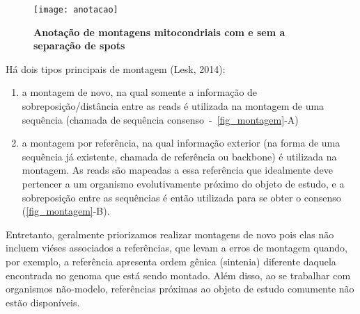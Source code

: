 \documentclass[../DISSERTACAO_MAIN.tex]{subfiles}
\begin{document}
\begin{figure}[htb]
	\texttt{[image: anotacao]}
	\caption[Anotação de montagens mitocondriais e separação de spots] {\textbf{Anotação de montagens mitocondriais com e sem a separação de spots}}
	\label{fig_anotacao}
\end{figure}


Há dois tipos principais de montagem (Lesk, 2014): 

\begin{enumerate}[label=(\roman*)]
		\item a montagem de novo, na qual somente a informação de sobreposição/distância entre as reads é utilizada na montagem de uma sequência (chamada de sequência consenso~-~\autoref{fig_montagem}-A)
	\item  a montagem por referência, na qual informação exterior (na forma de uma sequência já existente, chamada de referência ou backbone) é utilizada na montagem. As reads são mapeadas a essa referência que idealmente deve pertencer a um organismo evolutivamente próximo do objeto de estudo, e a sobreposição entre as sequências é então utilizada para se obter o consenso (\autoref{fig_montagem}-B).
\end{enumerate}

 Entretanto, geralmente priorizamos realizar montagens de novo pois elas não incluem viéses associados  a referências, que levam a erros de montagem quando, por exemplo, a referência apresenta ordem gênica (sintenia) diferente daquela encontrada no genoma que está sendo montado. Além disso, ao se trabalhar com organismos não-modelo, referências próximas ao objeto de estudo comumente não estão disponíveis.
\end{document}
